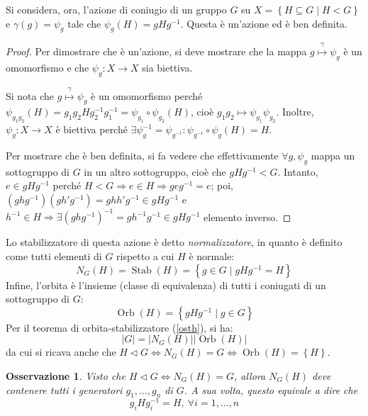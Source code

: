 \documentclass[11pt]{article}
\theoremstyle{style}
\newtheorem{osservazione}{Osservazione}[section]
\numberwithin{equation}{subsection}
\begin{document}
\noindent Si considera, ora, l'azione di coniugio di un gruppo $G$ su $X = \left\{ H \subseteq G  \mid H< G \right\} $ e $\gamma(g) = \psi _g$ tale che $\psi_g (H) = gH g^{-1} $. 
Questa \`e un'azione ed \`e ben definita.
\begin{proof}
	Per dimostrare che \`e un'azione, si deve mostrare che la mappa $g \stackrel{\gamma}{\mapsto} \psi _g$ \`e un omomorfismo e che $\psi _g : X \to X$ sia biettiva.

	Si nota che $g \stackrel{\gamma}{\mapsto} \psi _g$ \`e un omomorfismo perch\'e $\psi _{g_1g_2} (H) = g_1g_2Hg_2^{-1}g_1^{-1} = \psi _{g_1} \circ \psi _{g_2} (H)$, cio\`e $g_1g_2\mapsto \psi _{g_1} \psi _{g_2} $.
	Inoltre, $\psi _g:X\to X$ \`e biettiva perch\'e $\exists \psi ^{-1} _g = \psi _{g^{-1}} : \psi _{g^{-1}} \circ \psi _g (H) = H $.

	Per mostrare che \`e ben definita, si fa vedere che effettivamente $\forall g, \psi_g$ mappa un sottogruppo di $G$ in un altro sottogruppo, cio\`e che $gHg^{-1} < G$.
	Intanto, $e \in gHg^{-1} $ perch\'e $H < G \Rightarrow  e \in H \Rightarrow geg^{-1}=e$; poi, $(ghg^{-1})(gh'g^{-1}) = ghh'g^{-1} \in g H g ^{-1}$ e $h^{-1} \in H \Rightarrow \exists (ghg^{-1} )^{-1} = g h^{-1}g^{-1}\in gHg^{-1}$ elemento inverso.
\end{proof}
\noindent Lo stabilizzatore di questa azione \`e detto \textit{normalizzatore}, in quanto \`e definito come tutti elementi di $G$ rispetto a cui $H$ \`e normale: 
\begin{equation}
	N_G(H) = \operatorname{Stab} (H) = \left\{ g \in G  \mid g H g^{-1}= H \right\} 
\end{equation}
Infine, l'orbita \`e l'insieme (classe di equivalenza) di tutti i coniugati di un sottogruppo di $G$:
\begin{equation}
\operatorname{Orb} (H) = \left\{ gHg^{-1}  \mid  g \in G \right\} 
\end{equation}
Per il teorema di orbita-stabilizzatore (\ref{osth}), si ha:
\begin{equation}
	\lvert G \rvert  = \lvert N_G(H) \rvert \lvert \operatorname{Orb} (H) \rvert 
\end{equation}
da cui si ricava anche che $H \lhd G \iff N_G(H) = G \iff \operatorname{Orb} (H) = \left\{ H \right\} $.
\begin{osservazione}
Visto che $H \lhd G \iff N_G(H) = G$, allora $N_G(H)$ deve contenere tutti i generatori $g_1,\ldots,g_n$ di $G$.
A sua volta, questo equivale a dire che 
\[
g_i H g_i^{-1} = H , \ \forall i=1,\ldots,n
\] 
\end{osservazione}
\end{document}
